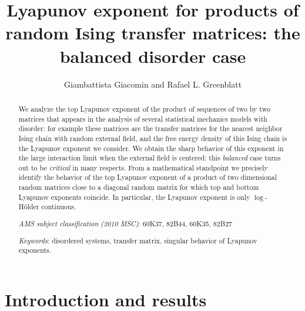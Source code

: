 \documentclass[reqno,11pt]{amsart}
\numberwithin{equation}{section}
\begin{document}
\title[Ising transfer matrix with balanced disorder]{Lyapunov exponent for products of random Ising transfer matrices: the balanced disorder case}


\author[G. Giacomin and R. L. Greenblatt]{Giambattista Giacomin and Rafael L. Greenblatt}
\address[GG]{Universit\'e de Paris,  Laboratoire de Probabilit{\'e}s, Statistiques  et Mod\'elisation, UMR 8001,
            F-75205 Paris, France}
    \address[RLG]{Scuola Internazionale Superiore di Studi Avanzati (SISSA), Mathematics Area, 
	via Bonomea 265,
 34136 Trieste, Italy}

\begin{abstract}
We analyze  the top Lyapunov exponent of the product of  sequences of two by two matrices that appears in the analysis of several statistical mechanics models with disorder: for example these matrices are    the transfer matrices for
 the  nearest neighbor Ising chain with random external field, and  the free energy density of this Ising chain is the  Lyapunov exponent we consider. %
 We obtain the  sharp behavior of this   exponent in  the large interaction limit when 
the external field is centered:   
this \emph{balanced} case turns out to be   \emph{critical} in many respects. 
 From a mathematical standpoint we precisely identify the  behavior of the top Lyapunov exponent
of a product of two dimensional random matrices close to a diagonal random matrix for which  top and bottom Lyapunov exponents coincide. In particular, the
Lyapunov exponent is only $\log$-H\"older continuous. 
 
\bigskip

\noindent  \emph{AMS  subject classification (2010 MSC)}:
60K37,  %
82B44, %
60K35, %
82B27  %



\smallskip
\noindent
\emph{Keywords}: disordered systems,  transfer matrix, singular behavior of Lyapunov exponents.
\end{abstract}

\maketitle

\section{Introduction and results}
\end{document}
